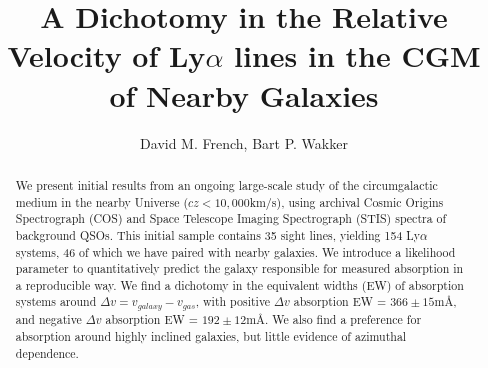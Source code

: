 \documentclass[iop]{emulateapj-rtx4}
\begin{document}

\title{A Dichotomy in the Relative Velocity of Ly$\alpha$ lines in the CGM of Nearby Galaxies}
\author{David M. French, Bart P. Wakker}



\begin{abstract}

We present initial results from an ongoing large-scale study of the circumgalactic medium in the nearby Universe ($cz < 10,000$km/s), using archival Cosmic Origins Spectrograph (COS) and Space Telescope Imaging Spectrograph (STIS) spectra of background QSOs. This initial sample contains 35 sight lines, yielding 154 Ly$\alpha$ systems, 46 of which we have paired with nearby galaxies. We introduce a likelihood parameter to quantitatively predict the galaxy responsible for measured absorption in a reproducible way. We find a dichotomy in the equivalent widths (EW) of absorption systems around $\Delta v = v_{galaxy} - v_{gas}$, with positive $\Delta v$ absorption EW = $366 \pm 15$m\AA, and negative $\Delta v$  absorption EW = $192 \pm 12$m\AA. We also find a preference for absorption around highly inclined galaxies, but little evidence of azimuthal dependence.



\end{abstract}


%
\end{document}
